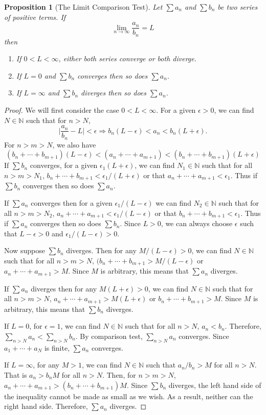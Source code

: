 \documentclass{article}
\theoremstyle{plain}
\numberwithin{thm}{section}
\theoremstyle{plain}
\newtheorem{prop}{Proposition}
\numberwithin{prop}{section}
\theoremstyle{definition}
\numberwithin{defn}{section}
\theoremstyle{remark}
\numberwithin{equation}{section}
\begin{document}
\begin{prop}[The Limit Comparison Test]\label{s4p3}
Let $\sum a_n$ and $\sum b_n$ be two series of positive terms. If
\[
\lim_{n \rightarrow \infty} \frac{a_n}{b_n} = L
\]
then
\begin{enumerate}
\item If $0 < L < \infty$, either both series converge or both diverge.
\item If $L = 0$ and $\sum b_n$ converges then so does $\sum a_n$.
\item If $L = \infty$ and $\sum b_n$ diverges then so does $\sum a_n$.
\end{enumerate}
\end{prop}
\begin{proof}
We will first consider the case $0 < L < \infty$. For a given $\epsilon > 0$,
we can find $N \in \mathbb{N}$ such that for $n > N$,
\[
\Big|\frac{a_n}{b_n} - L\Big| < \epsilon \Rightarrow
b_n(L - \epsilon) < a_n < b_n(L + \epsilon).
\]
For $n > m > N$, we also have 
\[
(b_n + \cdots + b_{m+1})(L - \epsilon) < (a_n + \cdots + a_{m+1}) <
(b_n + \cdots + b_{m+1})(L + \epsilon)
\]
If $\sum b_n$ converges, for a given $\epsilon_1(L + \epsilon)$, we can find
$N_1 \in \mathbb{N}$ such that for all $n > m > N_1$, $b_n + \cdots + b_{m+1}
< \epsilon_1/(L + \epsilon)$ or that $a_n + \cdots + a_{m+1} < \epsilon_1$.
Thus if $\sum b_n$ converges then so does $\sum a_n$.

If $\sum a_n$ converges then for a given $\epsilon_1/(L - \epsilon)$ we can find
$N_2 \in \mathbb{N}$ such that for all $n > m > N_2$, $a_n + \cdots + a_{m+1}
< \epsilon_1/(L - \epsilon)$ or that $b_n + \cdots + b_{m+1} < \epsilon_1$.
Thus if $\sum a_n$ converges then so does $\sum b_n$. Since $L > 0$, we can 
always choose $\epsilon$ such that $L - \epsilon > 0$ and $\epsilon_1/(L - 
\epsilon) > 0$.

Now suppose $\sum b_n$ diverges. Then for any $M/(L - \epsilon) > 0$, we can
find $N \in \mathbb{N}$ such that for all $n>m > N$, $(b_n + \cdots + b_{m+1} > 
M/(L - \epsilon)$ or $a_n + \cdots + a_{m+1} > M$. Since $M$ is arbitrary, this 
means that $\sum a_n$ diverges.

If $\sum a_n$ diverges then for any $M(L + \epsilon) > 0$, we can find $N \in
\mathbb{N}$ such that for all $n > m >N$, $a_n + \cdots + a_{m+1} > M(L + 
\epsilon)$ or $b_n + \cdots + b_{m+1} > M$. Since $M$ is arbitrary, this means 
that $\sum b_n$ diverges.

If $L = 0$, for $\epsilon = 1$, we can find $N \in \mathbb{N}$ such that
for all $n > N$, $a_n < b_n$. Therefore, $\sum_{n > N} a_n < \sum_{n > N} b_n$.
By comparison test, $\sum_{n > N} a_n$ converges. Since $a_1 + \cdots + a_N$
is finite, $\sum a_n$ converges.

If $L = \infty$, for any $M > 1$, we can find $N \in \mathbb{N}$ such that
$a_n/b_n > M$ for all $n > N$. That is $a_n > b_nM$ for all $n > N$. Then, for
$n > m > N$, $a_n + \cdots + a_{m+1} > (b_n + \cdots + b_{m+1})M$. Since $\sum
b_n$ diverges, the left hand side of the inequality cannot be made as small
as we wish. As a result, neither can the right hand side. Therefore, $\sum a_n$
diverges.
\end{proof}
\end{document}
